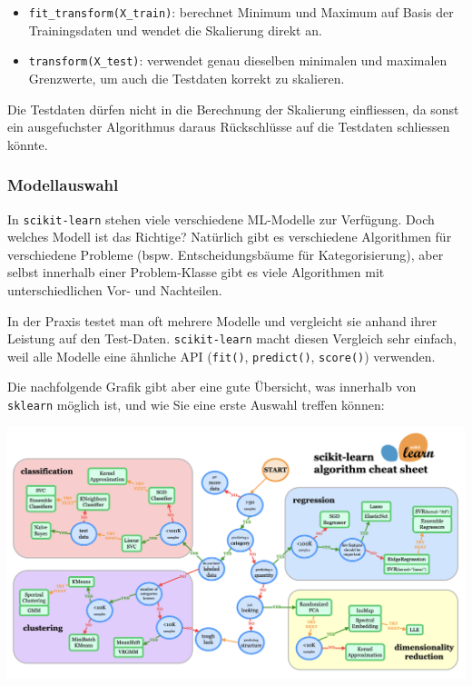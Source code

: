 \begin{lpu}
\begin{itemize}
  \item \texttt{fit\_transform(X\_train)}: berechnet Minimum und Maximum auf Basis der Trainingsdaten und wendet die Skalierung direkt an.
  \item \texttt{transform(X\_test)}: verwendet genau dieselben minimalen und maximalen Grenzwerte, um auch die Testdaten korrekt zu skalieren.
\end{itemize}

Die Testdaten dürfen nicht in die Berechnung der Skalierung einfliessen, da sonst ein ausgefuchster Algorithmus daraus Rückschlüsse auf die Testdaten schliessen könnte.


\subsubsection*{Modellauswahl}

In \texttt{scikit-learn} stehen viele verschiedene ML-Modelle zur Verfügung. Doch welches Modell ist das Richtige? Natürlich gibt es verschiedene Algorithmen für verschiedene Probleme (bspw. Entscheidungsbäume für Kategorisierung), aber selbst innerhalb einer Problem-Klasse gibt es viele Algorithmen mit unterschiedlichen Vor- und Nachteilen.

In der Praxis testet man oft mehrere Modelle und vergleicht sie anhand ihrer Leistung auf den Test-Daten. \texttt{scikit-learn} macht diesen Vergleich sehr einfach, weil alle Modelle eine ähnliche API (\texttt{fit()}, \texttt{predict()}, \texttt{score()}) verwenden.

Die nachfolgende Grafik gibt aber eine gute Übersicht, was innerhalb von \texttt{sklearn} möglich ist, und wie Sie eine erste Auswahl treffen können:

\begin{center}
  \includegraphics[width=0.9\linewidth]{algos.png}
\end{center}


\end{lpu}

